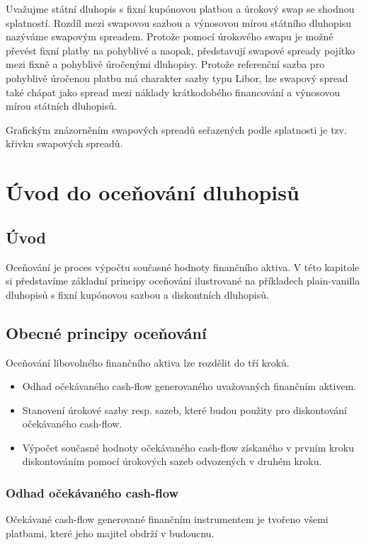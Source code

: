 \documentclass[a4paper]{book}
\begin{document}
Uvažujme státní dluhopis s fixní kupónovou platbou a úrokový swap se shodnou splatností. Rozdíl mezi swapovou sazbou a výnosovou mírou státního dluhopisu nazýváme swapovým spreadem. Protože pomocí úrokového swapu je možné převést fixní platby na pohyblivé a naopak, představují swapové spready pojítko mezi fixně a pohyblivě úročenými dluhopisy. Protože referenční sazba pro pohyblivě úročenou platbu má charakter sazby typu Libor, lze swapový spread také chápat jako spread mezi náklady krátkodobého financování a výnosovou mírou státních dluhopisů.

Grafickým znázorněním swapových spreadů seřazených podle splatnosti je tzv. křivku swapových spreadů.

\chapter{Úvod do oceňování dluhopisů}

\section{Úvod}

Oceňování je proces výpočtu současné hodnoty finančního aktiva. V této kapitole si představíme základní principy oceňování ilustrované na příkladech plain-vanilla dluhopisů s fixní kupónovou sazbou a diskontních dluhopisů.

\section{Obecné principy oceňování}

Oceňování libovolného finančního aktiva lze rozdělit do tří kroků.
\begin{itemize}
\item Odhad očekávaného cash-flow generovaného uvažovaných finančním aktivem.
\item Stanovení úrokové sazby resp. sazeb, které budou použity pro diskontování očekávaného cash-flow.
\item Výpočet současné hodnoty očekávaného cash-flow získaného v prvním kroku diskontováním pomocí úrokových sazeb odvozených v druhém kroku.
\end{itemize}

\subsection{Odhad očekávaného cash-flow}

Očekávané cash-flow generované finančním instrumentem je tvořeno všemi platbami, které jeho majitel obdrží v budoucnu.
\end{document}
